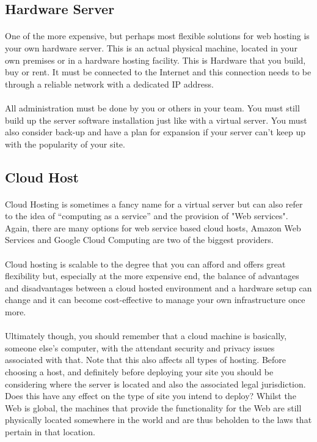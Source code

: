 \subsection{Hardware Server}
\paragraph{} One of the more expensive, but perhaps most flexible solutions for web hosting is your own hardware server. This is an actual physical machine, located in your own premises or in a hardware hosting facility. This is Hardware that you build, buy or rent. It must be connected to the Internet and this connection needs to be through a reliable network with a dedicated IP address.
\paragraph{} All administration must be done by you or others in your team. You must still build up the server software installation just like with a virtual server. You must also consider back-up and have a plan for expansion if your server can't keep up with the popularity of your site.


\subsection{Cloud Host}
\paragraph{} Cloud Hosting is sometimes a fancy name for a virtual server but can also refer to the idea of “computing as a service” and the provision of "Web services". Again, there are many options for web service based cloud hosts, Amazon Web Services and Google Cloud Computing are two of the biggest providers.
\paragraph{} Cloud hosting is scalable to the degree that you can afford and offers great flexibility but, especially at the more expensive end, the balance of advantages and disadvantages between a cloud hosted environment and a hardware setup can change and it can become cost-effective to manage your own infrastructure once more.
\paragraph{} Ultimately though, you should remember that a cloud machine is basically, someone else’s computer, with the attendant security and privacy issues associated with that. Note that this also affects all types of hosting. Before choosing a host, and definitely before deploying your site you should be considering where the server is located and also the associated legal jurisdiction. Does this have any effect on the type of site you intend to deploy? Whilst the Web is global, the machines that provide the functionality for the Web are still physically located somewhere in the world and are thus beholden to the laws that pertain in that location.

